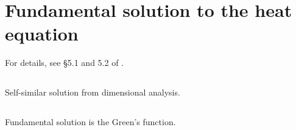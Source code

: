 \documentclass[11pt,letterpaper]{article}
\begin{document}
\section{Fundamental solution to the heat equation}
For details, see \S 5.1 and 5.2 of \cite{ShearerLevy_15}.

\subsection{}
Self-similar solution from dimensional analysis. 

\subsection{}
Fundamental solution is the Green's function.




    
\vfill
\printbibliography
\end{document}
